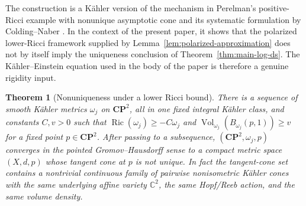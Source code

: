 \documentclass[11pt]{amsart}
\newtheorem{theorem}{Theorem}[section]
\theoremstyle{definition}
\theoremstyle{remark}
\begin{document}
The construction is a K\"ahler version of the mechanism in Perelman's positive-Ricci example with nonunique asymptotic cone and its systematic formulation by Colding--Naber \cite{PerelmanNonunique,ColdingNaberTangents}.  In the context of the present paper, it shows that the polarized lower-Ricci framework supplied by Lemma~\ref{lem:polarized-approximation} does not by itself imply the uniqueness conclusion of Theorem~\ref{thm:main-log-ds}.  The K\"ahler--Einstein equation used in the body of the paper is therefore a genuine rigidity input.

\begin{theorem}[Nonuniqueness under a lower Ricci bound]
\label{thm:lower-ricci-nonunique}
There is a sequence of smooth K\"ahler metrics $\omega_j$ on $\mathbf{CP}^2$, all in one fixed integral K\"ahler class, and constants $C,v>0$ such that $\operatorname{Ric}(\omega_j)\geq-C\omega_j$ and $\operatorname{Vol}_{\omega_j}(B_{\omega_j}(p,1))\geq v$ for a fixed point $p\in\mathbf{CP}^2$.  After passing to a subsequence, $(\mathbf{CP}^2,\omega_j,p)$ converges in the pointed Gromov--Hausdorff sense to a compact metric space $(X,d,p)$ whose tangent cone at $p$ is not unique.  In fact the tangent-cone set contains a nontrivial continuous family of pairwise nonisometric K\"ahler cones with the same underlying affine variety $\mathbb C^2$, the same Hopf/Reeb action, and the same volume density.
\end{theorem}
\end{document}
